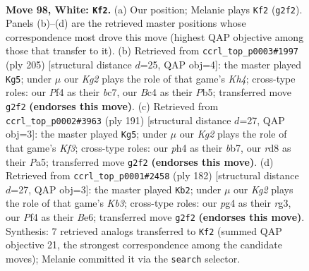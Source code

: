 \documentclass[11pt]{article}
\begin{document}
\clearpage

\begin{figure}[p]\centering
\begin{subfigure}{0.46\textwidth}\centering
\resizebox{\linewidth}{!}{%
\newchessgame
\chessboard[
  setfen={3r4/5pk1/6p1/4P3/bnB2Ppp/1N6/6KP/8 w - - 10 98},
  showmover=false,
  pgfstyle=straightmove, color=movearrow, markmove={g2-f2}
]}
\caption{}
\end{subfigure}\hfill
\begin{subfigure}{0.46\textwidth}\centering
\resizebox{\linewidth}{!}{%
\newchessgame
\chessboard[
  setfen={8/2B5/8/1p5k/1Pb2p1p/5P1P/1P4P1/6K1 b - - 77 103},
  showmover=false,
  pgfstyle=straightmove, color=movearrow, markmove={h5-g5}
]}
\caption{}
\end{subfigure}
\\[4pt]
\begin{subfigure}{0.46\textwidth}\centering
\resizebox{\linewidth}{!}{%
\newchessgame
\chessboard[
  setfen={8/1B6/5k2/p1b2p2/P1P1p1p1/4P1P1/5P2/5K2 b - - 63 96},
  showmover=false,
  pgfstyle=straightmove, color=movearrow, markmove={f6-g5}
]}
\caption{}
\end{subfigure}\hfill
\begin{subfigure}{0.46\textwidth}\centering
\resizebox{\linewidth}{!}{%
\newchessgame
\chessboard[
  setfen={3B4/7p/p3B1pP/2k2p2/2Pp1P2/1K4r1/8/8 w - - 12 92},
  showmover=false,
  pgfstyle=straightmove, color=movearrow, markmove={b3-b2}
]}
\caption{}
\end{subfigure}
\caption{\textbf{Move 98, White: \texttt{Kf2}.} (a) Our position; Melanie plays \texttt{Kf2} (\texttt{g2f2}). Panels (b)--(d) are the retrieved master positions whose correspondence most drove this move (highest QAP objective among those that transfer to it). (b) Retrieved from \texttt{ccrl\_top\_p0003\#1997} (ply 205) [structural distance $d$=25, QAP obj=4]: the master played \texttt{Kg5}; under $\mu$ our \emph{Kg2} plays the role of that game's \emph{Kh4}; cross-type roles: our \emph{P}f4 as their \emph{b}c7, our \emph{B}c4 as their \emph{P}b5; transferred move \texttt{g2f2} \textbf{(endorses this move)}. (c) Retrieved from \texttt{ccrl\_top\_p0002\#3963} (ply 191) [structural distance $d$=27, QAP obj=3]: the master played \texttt{Kg5}; under $\mu$ our \emph{Kg2} plays the role of that game's \emph{Kf3}; cross-type roles: our \emph{p}h4 as their \emph{b}b7, our \emph{r}d8 as their \emph{P}a5; transferred move \texttt{g2f2} \textbf{(endorses this move)}. (d) Retrieved from \texttt{ccrl\_top\_p0001\#2458} (ply 182) [structural distance $d$=27, QAP obj=3]: the master played \texttt{Kb2}; under $\mu$ our \emph{Kg2} plays the role of that game's \emph{Kb3}; cross-type roles: our \emph{p}g4 as their \emph{r}g3, our \emph{P}f4 as their \emph{B}e6; transferred move \texttt{g2f2} \textbf{(endorses this move)}. Synthesis: 7 retrieved analogs transferred to \texttt{Kf2} (summed QAP objective 21, the strongest correspondence among the candidate moves); Melanie committed it via the \texttt{search} selector.}
\label{fig:thought-m194}
\end{figure}
\end{document}
